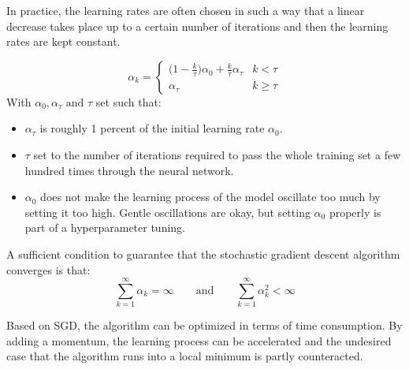 \begin{remark}\label{rem:fall_lernRate}
	In practice, the learning rates are often chosen in such a way that a linear decrease takes place up to a certain number of iterations and then the learning rates are kept constant.
	
	\begin{equation*}
		\alpha_k = 
		\begin{cases}
			\big(1 - \frac{k}{\tau} \big) \alpha_0 + \frac{k}{\tau} \alpha_\tau 	& \text{$k < \tau$}\\
			\alpha_\tau 															& \text{$k \geq \tau$}
		\end{cases}
	\end{equation*}
	With $\alpha_0, \alpha_\tau \text{ and } \tau$ set such that:
	\begin{itemize}
		\item $\alpha_\tau$ is roughly 1 percent of the initial learning rate $\alpha_0$.
		\item $\tau$ set to the number of iterations required to pass the whole training set a few hundred times through the neural network.
		\item $\alpha_0$ does not make the learning process of the model oscillate too much by setting it too high. Gentle oscillations are okay, but setting $\alpha_0$ properly is part of a hyperparameter tuning.
	\end{itemize}
	
\end{remark}

\begin{remark}	
A sufficient condition to guarantee that the stochastic gradient descent algorithm converges is that:
	\begin{equation*}
	\sum_{k=1}^\infty \alpha_k = \infty \quad \quad \text{and} \quad \quad \sum_{k=1}^\infty \alpha_k^2 < \infty
	\end{equation*}
\end{remark}

Based on SGD, the algorithm can be optimized in terms of time consumption. By adding a momentum, the learning process can be accelerated and the undesired case that the algorithm runs into a local minimum is partly counteracted.

